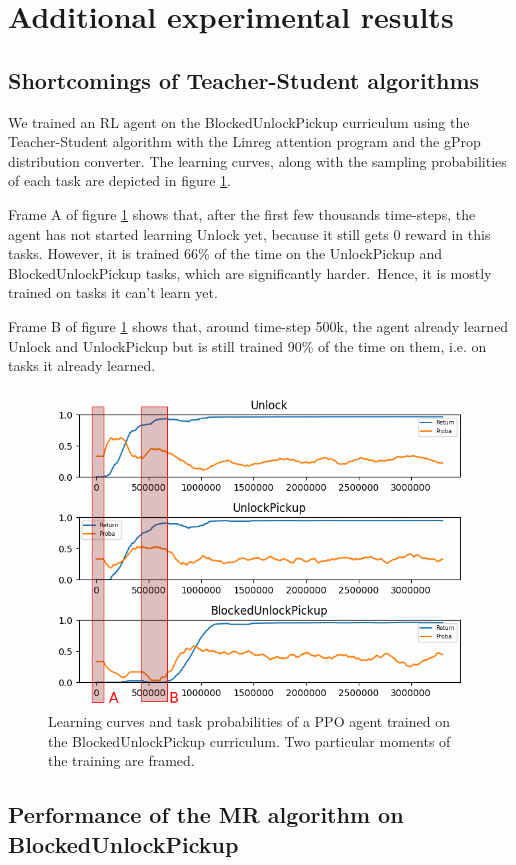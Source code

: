 \documentclass{article}
\begin{document}
\section{Additional experimental results}

\subsection{Shortcomings of Teacher-Student algorithms}
\label{appendix:shortocmings}

We trained an RL agent on the BlockedUnlockPickup curriculum using the Teacher-Student algorithm with the Linreg attention program and the gProp distribution converter. The learning curves, along with the sampling probabilities of each task are depicted in figure \ref{fig:BUP-ReturnProba}.

Frame A of figure \ref{fig:BUP-ReturnProba} shows that, after the first few thousands time-steps, the agent has not started learning Unlock yet, because it still gets 0 reward in this tasks. However, it is trained 66\% of the time on the UnlockPickup and BlockedUnlockPickup tasks, which are significantly harder.\ Hence, it is mostly trained on tasks it can't learn yet.

Frame B of figure \ref{fig:BUP-ReturnProba} shows that, around time-step 500k, the agent already learned Unlock and UnlockPickup but is still trained 90\% of the time on them, i.e. on tasks it already learned.
\begin{figure}[H]
\centering
\includegraphics[width=.6\linewidth]{Stats/BUP-ReturnProba-GPropLinreg_cadres}
\caption{Learning curves and task probabilities of a PPO agent trained on the BlockedUnlockPickup curriculum. Two particular moments of the training are framed.}
\label{fig:BUP-ReturnProba}
\end{figure}

\subsection{Performance of the MR algorithm on BlockedUnlockPickup}
\label{app:blockedunlockpickup}
\end{document}
